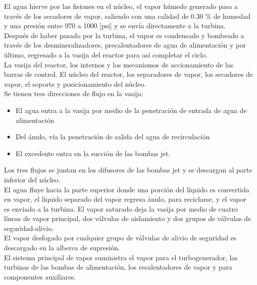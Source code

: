 \documentclass[]{article}
\begin{document}
El agua hierve por las fisiones en el núcleo, el vapor húmedo generado pasa a través de los secadores de vapor,  saliendo con una calidad de 0.30 $\%$ de humedad y una presión entre 970 a 1000 [psi] y se envía directamente a la turbina.\\

Después de haber pasado por la turbina, el vapor es condensado y bombeado a través de los desmineralizadores, precalentadores de agua de alimentación y por último, regresado a la vasija del reactor para así completar el ciclo.\\

La vasija del reactor, los internos y los mecanismos de accionamiento de las barras de control. El núcleo del reactor, los separadores de vapor, los secadores de vapor, el soporte y posicionamiento del núcleo. \\



Se tienen tres direcciones de flujo en la vasija:\\


\begin{itemize}
	 
	\item El agua entra a la vasija por medio de la penetración de entrada de agua de alimentación
	
\item Del ánulo, vía la penetración de salida del agua de recirculación  
	
\item El excedente entra en la succión de las bombas jet.
	
\end{itemize}

Los tres flujos se juntan en los difusores de las bombas jet y se descargan al parte inferior del núcleo.\\

El agua fluye hacia la parte superior donde una porción del líquido es convertida en vapor, el líquido separado del vapor regresa ánulo, para reciclarse, y el vapor es enviado a la turbina. El vapor saturado deja la vasija  por medio de cuatro líneas de vapor principal, dos válvulas de aislamiento y dos grupos de válvulas de seguridad-alivio.\\

El vapor desfogado por cualquier grupo de válvulas de alivio de seguridad es descargado en la alberca de supresión.\\

El sistema principal de vapor suministra el vapor para el turbogenerador, las turbinas de las bombas de alimentación, los recalentadores de vapor y para componentes auxiliares.\\
\end{document}
